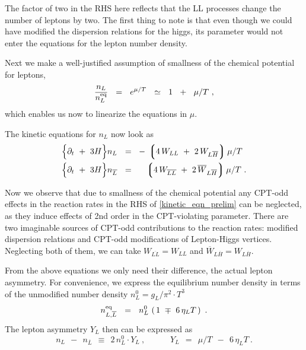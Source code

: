 \documentclass[12pt]{revtex4}
\newcommand{\eq}{{\rm eq}}
\newcommand{\lgr}{\left\lgroup}
\newcommand{\rgr}{\right\rgroup}
\newcommand{\p}{\partial}
\newcommand{\ov}{\overline}
\begin{document}
	The factor of two in the RHS here reflects that the LL processes
	change the number of leptons by two.
	The first thing to note is that even though we could have 
	modified the dispersion relations for the higgs, 
	its parameter would not enter the equations for the lepton number
	density.
	
	Next we make a well-justified assumption of 
	smallness of the chemical potential for leptons,
\[
	\frac{n_L}{n_L^\eq} ~~=~~ e^{\mu/T} ~~\simeq~~ 1 ~~+~~ \mu/T~,
\]
	which enables us now to linearize the equations in $ \mu $.

	The kinetic equations for $ n_L $ now look as
\begin{equation}
\label{kinetic_eqn_prelim}
\begin{split}
	\Bigl\{ \p_t ~+~ 3H \Bigr\}
		n_L ~~=~~ & 
	-\, \lgr 4\, W_{LL} ~+~ 2\, W_{L\ov{H}} \rgr  \mu/T \\
	\Bigl\{ \p_t ~+~ 3H \Bigr\} 
		n_{\ov{L}} ~~=~~ &
	\phantom{-\,}
	\lgr 4\, W_{\ov{LL}} ~+~ 2\, \ov{W}_{L\ov{H}} \rgr  \mu/T ~.
\end{split}
\end{equation}

	Now we observe that due to smallness of the chemical potential
	any CPT-odd effects in the reaction rates in the RHS of 
	\eqref{kinetic_eqn_prelim} can be neglected, as
	they induce effects of 2nd order in the CPT-violating parameter.
	There are two imaginable sources of CPT-odd contributions 
	to the reaction rates: modified dispersion relations and 
	CPT-odd modifications of Lepton-Higgs vertices. 
	Neglecting both of them, we can take
	$ W_{\ov{LL}} = W_{LL} $ and
	$ \ov{W}_{L\ov{H}} = W_{L\ov{H}} $.

	From the above equations we only need their difference, the actual
	lepton asymmetry.
	For convenience, we express the equilibrium number density in terms
	of the unmodified number density 
	$ n_L^0 = g_L/\pi^2 \cdot T^3 $
\[
	n_{L,\ov{L}}^\eq ~~=~~ n_L^0\, \left(\, 1 ~\mp~ 6\,\eta_L T \,\right)~.
\]
	The lepton asymmetry $ Y_L $ then can be expressed as
\[
	n_L ~~-~~ n_{\ov{L}} ~~\equiv~~ 2\, n_L^0 \cdot Y_L~,
	\qquad\quad Y_L ~~=~~ \mu/T ~~-~~ 6\,\eta_L T~.
\]
	
\end{document}
